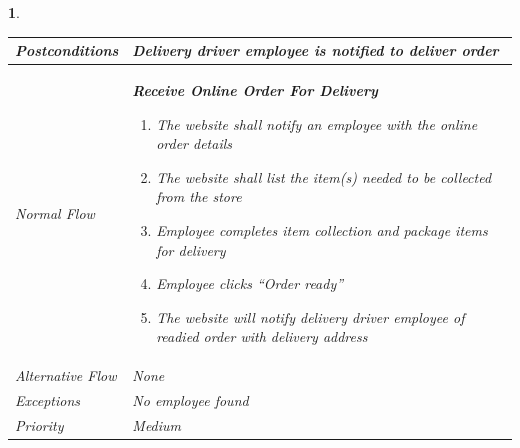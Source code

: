\documentclass{scrreprt}
\theoremstyle{funreq}
\newtheorem{funreq}{}
\begin{document}
\begin{funreq}
\begin{table}[H]
{\begin{tabularx}{\columnwidth}{|l|X|}
					\\ \hline Postconditions   & 
					Delivery driver employee is notified to deliver order 
					\\ \hline Normal Flow &
					\bfseries{Receive Online Order For Delivery}\normalfont\newline 
					\begin{enumerate}
					    \item The website shall notify an employee with the online order details
					    \item The website shall list the item(s) needed to be collected from the store
                        \item Employee completes item collection and package items for delivery
                        \item Employee clicks “Order ready”
                        \item The website will notify delivery driver employee of readied order with delivery address
					\end{enumerate}
					\\ \hline Alternative Flow & 
					None
					\\ \hline Exceptions & 
					No employee found
					\\ \hline Priority & 
					Medium
					\\ \hline
				\end{tabularx}%
			}
		\end{table}
	\end{funreq}


\end{document}
